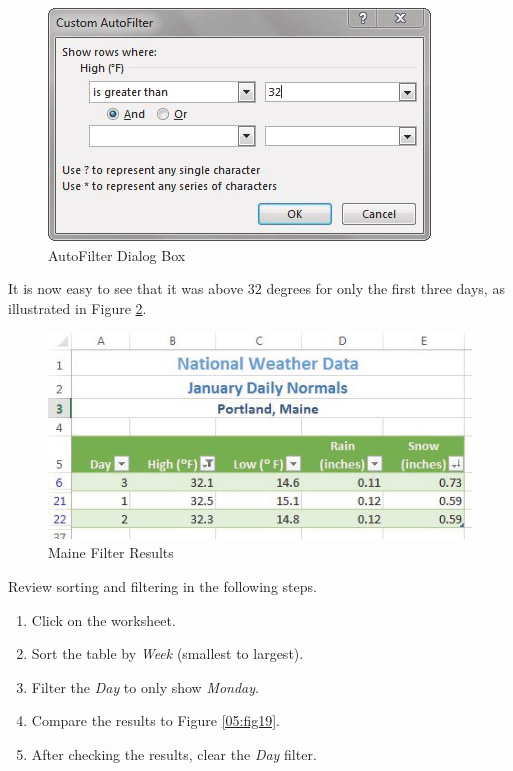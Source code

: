 \begin{figure}[H]
	\centering
	\includegraphics[width=\maxwidth{.95\linewidth}]{gfx/ch05_fig17}
	\caption{AutoFilter Dialog Box}
	\label{05:fig17}
\end{figure}

It is now easy to see that it was above $ 32 $ degrees for only the first three days, as illustrated in Figure \ref{05:fig18}.

\begin{figure}[H]
	\centering
	\includegraphics[width=\maxwidth{.95\linewidth}]{gfx/ch05_fig18}
	\caption{Maine Filter Results}
	\label{05:fig18}
\end{figure}

Review sorting and filtering in the following steps.

\begin{enumerate}
	\item Click on the  worksheet.
	\item Sort the table by \textit{Week} (smallest to largest).
	\item Filter the \textit{Day} to only show \textit{Monday}.
	\item Compare the results to Figure \ref{05:fig19}.
	\item After checking the results, clear the \textit{Day} filter.
\end{enumerate}

